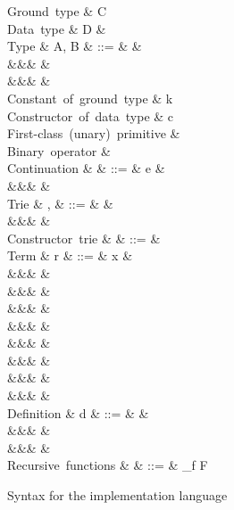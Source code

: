 \begin{figure}
\begin{syntaxfig}
\mbox{Ground type}
&
C
\\[2mm]
\mbox{Data type}
&
D
&
\\[2mm]
\mbox{Type}
&
A, B
&
::=
&
&
\\
&&&
&
\\
&&&
&
\\[2mm]
\mbox{Constant of ground type}
&
k
\\
\mbox{Constructor of data type}
&
c
\\
\mbox{First-class (unary) primitive}
&
\phi
\\
\mbox{Binary operator}
&
\primOp
\\[2mm]
\mbox{Continuation}
&
\kappa
&
::=
&
e
&
\\
&&&
\sigma
&
\\[2mm]
\mbox{Trie}
&
\sigma, \tau
&
::=
&
&
\\
&&&
\elimConstr{\Sigma}
&
\\[2mm]
\mbox{Constructor trie}
&
\Sigma
&
::=
&
\\[2mm]
\mbox{Term}
&
r
&
::=
&
x
&
\\
&&&
&
\\
&&&
\phi
&
\\
&&&
\exFun{\sigma}
&
\\
&&&
&
\\
&&&
&
\\
&&&
&
\\
&&&
&
\\
&&&
&
\\[2mm]
\mbox{Definition}
&
d
&
::=
&
&
\\
&&&
\exLetrecDef{\delta}
&
\\
&&&
&
\\[2mm]
\mbox{Recursive functions}
&
\delta
&
::=
&
_{f \in F}
\end{syntaxfig}
\caption{Syntax for the implementation language}
\label{fig:impl-language:syntax}
\end{figure}

